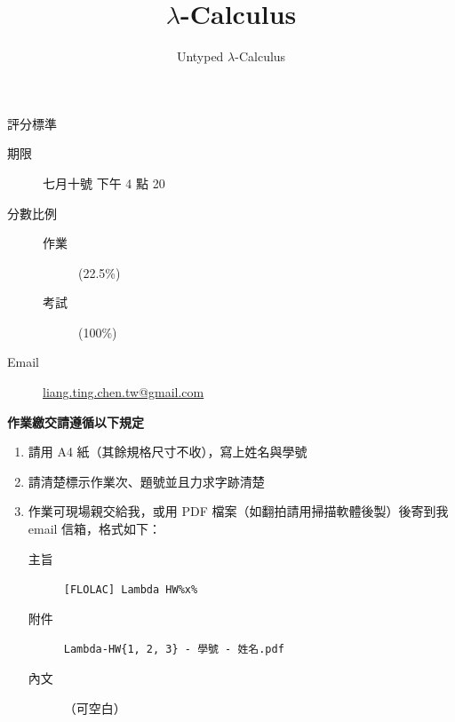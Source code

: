 
\title{\texorpdfstring{$\lambda$}{λ}-Calculus}
\subtitle{Untyped \texorpdfstring{$\lambda$}{λ}-Calculus}


\bgroup
  \begin{frame}
    \maketitle
  \end{frame}
\egroup

\begin{frame}[fragile]{評分標準}
  \begin{description}
    \item[期限] 七月十號 下午 4 點 20
    \item[分數比例] 
      \begin{description}
        \item[作業] (22.5\%)
        \item[考試] (100\%)
      \end{description}
    \item[Email] \url{liang.ting.chen.tw@gmail.com}
  \end{description}

  \textbf{作業繳交請遵循以下規定}

  \begin{enumerate}
    \item 請用 A4 紙（其餘規格尺寸不收），寫上姓名與學號
    \item 請清楚標示作業次、題號並且力求字跡清楚
    \item 作業可現場親交給我，或用 PDF 檔案（如翻拍請用掃描軟體後製）後寄到我 email 信箱，格式如下：
      \begin{description}
        \item[主旨] \texttt{[FLOLAC] Lambda HW\%x\%}
        \item[附件] \texttt{Lambda-HW\{1, 2, 3\} - 學號 - 姓名.pdf}
        \item[內文] （可空白）
      \end{description}
  \end{enumerate}
\end{frame}

